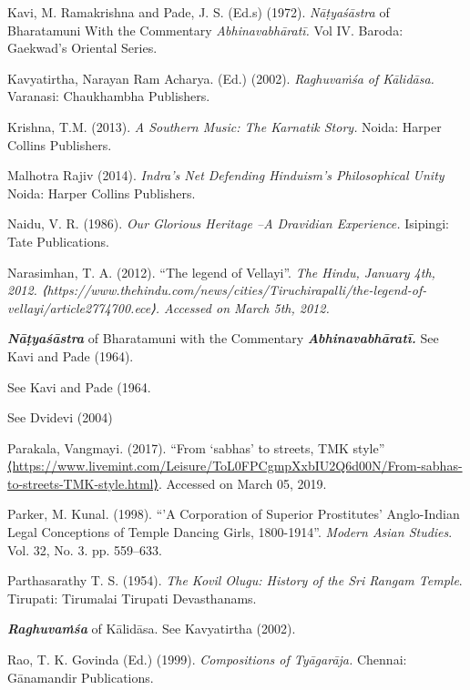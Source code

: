 {\begin{thebibliography}{99}
  Kavi, M. Ramakrishna and Pade, J. S. (Ed.s) (1972). \textit{Nāṭyaśāstra} of Bharatamuni With the Commentary \textit{Abhinavabhāratī. }Vol IV. Baroda: Gaekwad’s Oriental Series.

  Kavyatirtha, Narayan Ram Acharya. (Ed.) (2002). \textit{Raghuvaṁśa of Kālidāsa.} Varanasi: Chaukhambha Publishers.

  Krishna, T.M. (2013). \textit{A Southern Music: The Karnatik Story. }Noida: Harper Collins Publishers.

  Malhotra Rajiv (2014). \textit{Indra’s Net Defending Hinduism’s Philosophical Unity }Noida: Harper Collins Publishers.

  Naidu, V. R. (1986). \textit{Our Glorious Heritage –A Dravidian Experience. }Isipingi: Tate Publications.

  Narasimhan, T. A. (2012). ``The legend of Vellayi''. \textit{The Hindu, January 4th, 2012. ⟨https://www.thehindu.com/news/cities/Tiruchirapalli/the-legend-of-vellayi/article2774700.ece⟩. Accessed on March 5th, 2012.}

  \textbf{\textit{Nāṭyaśāstra}} of Bharatamuni with the Commentary \textbf{\textit{Abhinavabhāratī.}} See Kavi and Pade (1964).

 See Kavi and Pade (1964.

 See Dvidevi (2004)

  Parakala, Vangmayi. (2017). “From ‘sabhas’ to streets, TMK style” \url{⟨https://www.livemint.com/Leisure/ToL0FPCgmpXxbIU2Q6d00N/From-sabhas-to-streets-TMK-style.html⟩}. Accessed on March 05, 2019.

  Parker, M. Kunal. (1998). “'A Corporation of Superior Prostitutes' Anglo-Indian Legal Conceptions of Temple Dancing Girls, 1800-1914”. \textit{Modern Asian Studies}. Vol. 32, No. 3. pp. 559--633.

  Parthasarathy T. S. (1954). \textit{The Kovil Olugu: History of the Sri Rangam Temple}. Tirupati: Tirumalai Tirupati Devasthanams.

  \textit{\textbf{Raghuvaṁśa}} of Kālidāsa. See Kavyatirtha (2002).

  Rao, T. K. Govinda (Ed.) (1999). \textit{Compositions of Tyāgarāja. }Chennai: Gānamandir Publications.


\end{thebibliography}}
